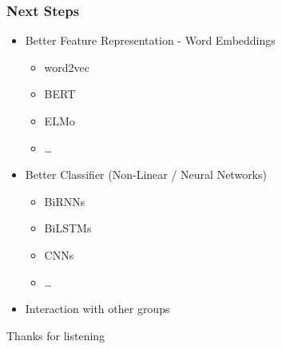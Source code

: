 \documentclass[
  xcolor={svgnames},
  hyperref={colorlinks,citecolor=DeepPink4,linkcolor=DarkRed,urlcolor=DarkBlue}
  ]{beamer}
\begin{document}
\begin{frame}
\frametitle{Next Steps}
	\begin{itemize}
		\item Better Feature Representation - Word Embeddings
		\begin{itemize}
			\item word2vec
			\item BERT
			\item ELMo
			\item \dots{}
		\end{itemize}
		
		\item Better Classifier (Non-Linear / Neural Networks)
		\begin{itemize}
			\item BiRNNs
			\item BiLSTMs
			\item CNNs
			\item \dots{}
		\end{itemize}
		
		\item Interaction with other groups
	\end{itemize}
\end{frame}

\begin{frame}
  \centering \Large
  	Thanks for listening
\end{frame}
\end{document}
